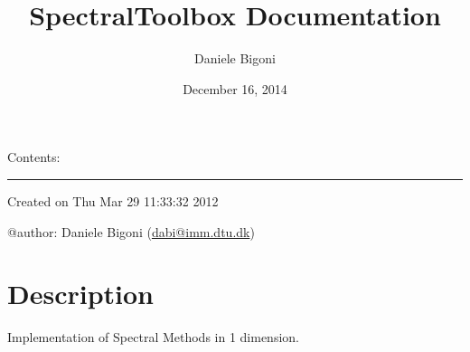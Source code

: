 \documentclass[letterpaper,10pt,english]{sphinxmanual}
\title{SpectralToolbox Documentation}
\date{December 16, 2014}
\author{Daniele Bigoni}
\begin{document}
\maketitle
\tableofcontents
{}\label{index::doc}


Contents:
\label{index:module-SpectralToolbox}

\bigskip\hrule{}\bigskip


Created on Thu Mar 29 11:33:32 2012

@author: Daniele Bigoni (\href{mailto:dabi@imm.dtu.dk}{dabi@imm.dtu.dk})


\chapter{Description}
\label{index:description}\label{index:welcome-to-spectraltoolbox-s-documentation}
Implementation of Spectral Methods in 1 dimension.
\end{document}
